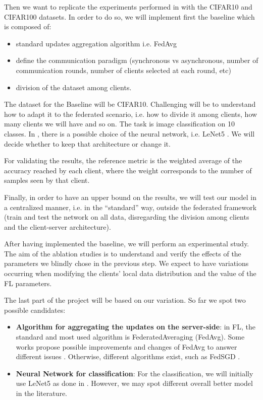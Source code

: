 \documentclass{article}
\begin{document}
Then we want to replicate the experiments performed in \cite{DBLP:journals/corr/abs-2003-08082} with the CIFAR10 and CIFAR100 datasets.
In order to do so, we will implement first the baseline which is composed of:
\begin{itemize}
    \item standard updates aggregation algorithm i.e. FedAvg
    \item define the communication paradigm (synchronous vs asynchronous, number of communication
		rounds, number of clients selected at each round, etc)
	\item division of the dataset among clients.
\end{itemize}
The dataset for the Baseline will be CIFAR10. Challenging will be to understand how to adapt it to
the federated scenario, i.e. how to divide it among clients, how many clients we will have and so on. The task is image classification on 10 classes. In \cite{DBLP:journals/corr/abs-2003-08082}, there is a possible choice of the neural
network, i.e. LeNet5 \cite{726791}. We will decide whether to keep that architecture or change it.

For validating the results, the reference metric is the weighted average of the accuracy reached
by each client, where the weight corresponds to the number of samples seen by that client. 

Finally, in order to have an upper bound on the results, we will test our model in a
centralized manner, i.e. in the “standard” way, outside the federated framework (train and test the network on all data, disregarding the division among clients and the client-server architecture).

After having implemented the baseline, we will perform an experimental study. The aim of the ablation studies is to understand and verify the effects of the parameters we
blindly chose in the previous step. We expect to have variations occurring when modifying the clients’ local data distribution and the value of the FL parameters.

The last part of the project will be based on our variation. So far we spot two possible candidates:

\begin{itemize}
    \item \textbf{Algorithm for aggregating the updates on the server-side}: in FL, the standard and most
used algorithm is FederatedAveraging (FedAvg). Some works propose possible improvements and changes of FedAvg to answer different issues \cite{DBLP:journals/corr/abs-1812-06127, DBLP:journals/corr/abs-2002-07948, pmlr-v119-karimireddy20a, pmlr-v108-reisizadeh20a}.
Otherwise, different algorithms exist, such as FedSGD \cite{pmlr-v54-mcmahan17a}.
\item \textbf{Neural Network for classification}: For the classification, we will initially use LeNet5 as done in \cite{DBLP:journals/corr/abs-2003-08082}. However, we may spot different overall better model in the literature.
\end{itemize}
\end{document}
